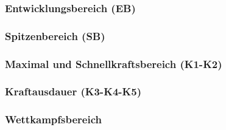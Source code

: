     \subsubsection{Entwicklungsbereich (EB)}
    \subsubsection{Spitzenbereich (SB)}
    \subsubsection{Maximal und Schnellkraftsbereich (K1-K2)}
    \subsubsection{Kraftausdauer (K3-K4-K5)}
    \subsubsection{Wettkampfsbereich}
